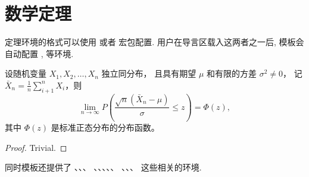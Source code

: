 \section{数学定理}

定理环境的格式可以使用  或者  宏包配置.
用户在导言区载入这两者之一后, 模板会自动配置 ,  等环境.

\begin{theorem}
  设随机变量 $X_1, X_2, \dots, X_n$ 独立同分布， 且具有期望 $\mu$ 和有限的方差 $\sigma^2 \ne 0$，
  记 $\bar{X}_n = \frac{1}{n} \sum_{i+1}^n X_i$，则
  \begin{equation}
    \lim_{n \to \infty} P \left(\frac{\sqrt{n} \left( \bar{X}_n - \mu \right)}{\sigma} \le z \right) = \Phi(z),
  \end{equation}
  其中 $\Phi(z)$ 是标准正态分布的分布函数。
\end{theorem}
\begin{proof}
  Trivial.
\end{proof}

同时模板还提供了 、、、
、、、、、
、、、 这些相关的环境.
